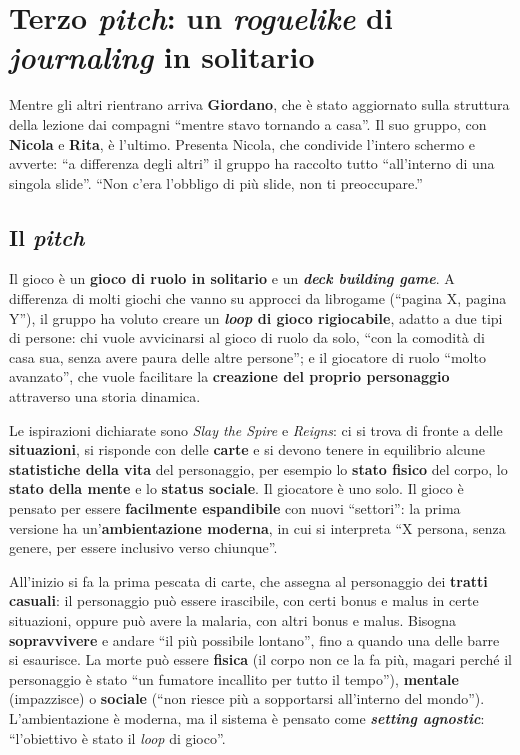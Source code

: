 \section{Terzo \emph{pitch}: un \emph{roguelike} di \emph{journaling} in solitario}
\label{a11:sec:roguelike}

Mentre gli altri rientrano arriva \textbf{Giordano}, che è stato aggiornato sulla
struttura della lezione dai compagni ``mentre stavo tornando a casa''. Il suo gruppo,
con \textbf{Nicola} e \textbf{Rita}, è l'ultimo. Presenta Nicola, che condivide l'intero
schermo e avverte: ``a differenza degli altri'' il gruppo ha raccolto tutto ``all'interno
di una singola slide''. ``Non c'era l'obbligo di più slide, non ti preoccupare.''

\subsection{Il \emph{pitch}}

Il gioco è un \textbf{gioco di ruolo in solitario} e un \textbf{\emph{deck building
game}}. A differenza di molti giochi che vanno su approcci da librogame (``pagina X,
pagina Y''), il gruppo ha voluto creare un \textbf{\emph{loop} di gioco rigiocabile},
adatto a due tipi di persone: chi vuole avvicinarsi al gioco di ruolo da solo, ``con la
comodità di casa sua, senza avere paura delle altre persone''; e il giocatore di ruolo
``molto avanzato'', che vuole facilitare la \textbf{creazione del proprio personaggio}
attraverso una storia dinamica.

Le ispirazioni dichiarate sono \emph{Slay the Spire} e \emph{Reigns}: ci si trova di
fronte a delle \textbf{situazioni}, si risponde con delle \textbf{carte} e si devono
tenere in equilibrio alcune \textbf{statistiche della vita} del personaggio, per esempio
lo \textbf{stato fisico} del corpo, lo \textbf{stato della mente} e lo \textbf{status
sociale}. Il giocatore è uno solo. Il gioco è pensato per essere \textbf{facilmente
espandibile} con nuovi ``settori'': la prima versione ha un'\textbf{ambientazione
moderna}, in cui si interpreta ``X persona, senza genere, per essere inclusivo verso
chiunque''.

All'inizio si fa la prima pescata di carte, che assegna al personaggio dei
\textbf{tratti casuali}: il personaggio può essere irascibile, con certi bonus e malus in
certe situazioni, oppure può avere la malaria, con altri bonus e malus. Bisogna
\textbf{sopravvivere} e andare ``il più possibile lontano'', fino a quando una delle
barre si esaurisce. La morte può essere \textbf{fisica} (il corpo non ce la fa più,
magari perché il personaggio è stato ``un fumatore incallito per tutto il tempo''),
\textbf{mentale} (impazzisce) o \textbf{sociale} (``non riesce più a sopportarsi
all'interno del mondo''). L'ambientazione è moderna, ma il sistema è pensato come
\textbf{\emph{setting agnostic}}: ``l'obiettivo è stato il \emph{loop} di gioco''.

